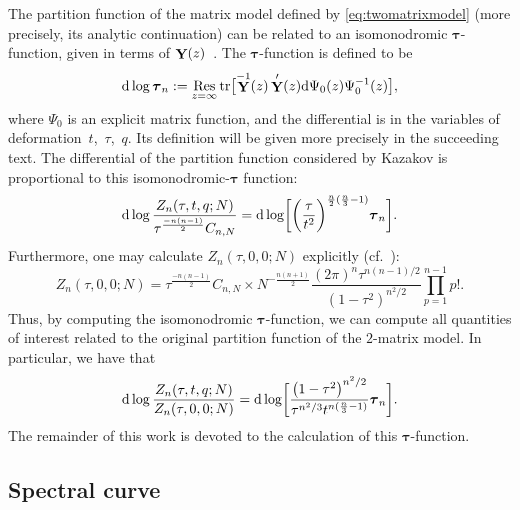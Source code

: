 \documentclass[pdftex]{sigma}
\DeclareMathOperator{\tr}{tr}
\DeclareMathOperator*{\Ress}{Res}
\newcommand{\Res}{\displaystyle\Ress}
\DeclareMathOperator{\YY}{{\bf Y}}
\numberwithin{equation}{section}
\begin{document}
The partition function of the matrix model defined by \eqref{eq:twomatrixmodel} (more precisely, its analytic continuation) can be related to an isomonodromic $\boldsymbol{\tau}$-function, given in terms of $\YY(z)$~\cite{Bertola-Marchal}. The $\boldsymbol{\tau}$-function is defined to be
 \begin{equation*} %
 {\rm d}\log \boldsymbol{\tau}_n := \Res_{z=\infty}\tr\bigl[ \YY^{-1}(z) \YY'(z) {\rm d}\Psi_0(z) \Psi_0^{-1}(z)\bigr],
 \end{equation*}
where $\Psi_0$ is an explicit matrix function, and the differential is in the variables of deformation~$t$,~$\tau$,~$q$. Its definition will be given more precisely in the succeeding text. The differential of the partition function
considered by Kazakov is proportional to this isomonodromic-$\boldsymbol{\tau}$ function:
 \begin{equation*} %
 {\rm d}\log \frac{Z_{n}(\tau,t,q;N)}{\tau^{\frac{-n(n-1)}{2}}C_{n,N}} = {\rm d}\log \biggl[\biggl(\frac{\tau}{t^2}\biggr)^{\frac{n}{2}(\frac{n}{3}-1)}\boldsymbol{\tau}_n\biggr].
 \end{equation*}
Furthermore, one may calculate $Z_{n}(\tau,0,0;N)$ explicitly (cf.~\cite[Appendix A.49]{Mehta-Book}):
 \begin{equation*} %
 Z_{n}(\tau,0,0;N) = \tau^{\frac{-n(n-1)}{2}}C_{n,N} \times N^{-\frac{n(n+1)}{2}}\frac{(2\pi)^{n}\tau^{n(n-1)/2}}{(1-\tau^2)^{n^2/2}}\prod_{p=1}^{n-1}p!.
 \end{equation*}
Thus, by computing the isomonodromic $\boldsymbol{\tau}$-function, we can compute all quantities of interest related to the original partition function of the $2$-matrix model. In particular, we have that
 \begin{equation*}
 {\rm d}\log \frac{Z_{n}(\tau,t,q;N)}{Z_{n}(\tau,0,0;N)} = {\rm d}\log \biggl[\frac{\bigl(1-\tau^2\bigr)^{n^2/2}}{\tau^{n^2/3}t^{n(\frac{n}{3}-1)}}\boldsymbol{\tau}_n\biggr].
 \end{equation*}
The remainder of this work is devoted to the calculation of this $\boldsymbol{\tau}$-function.


\subsection{Spectral curve}
\end{document}

